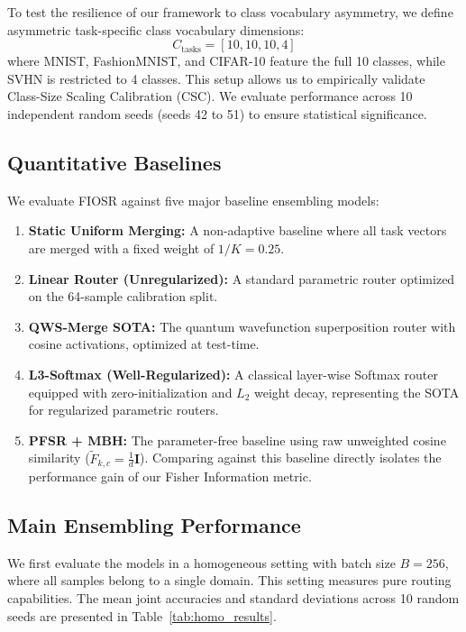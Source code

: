 To test the resilience of our framework to class vocabulary asymmetry, we define asymmetric task-specific class vocabulary dimensions:
\begin{equation}
C_{\text{tasks}} = [10, 10, 10, 4]
\end{equation}
where MNIST, FashionMNIST, and CIFAR-10 feature the full 10 classes, while SVHN is restricted to 4 classes. This setup allows us to empirically validate Class-Size Scaling Calibration (CSC). We evaluate performance across 10 independent random seeds (seeds 42 to 51) to ensure statistical significance.

\subsection{Quantitative Baselines}
\label{sec:baselines}
We evaluate FIOSR against five major baseline ensembling models:
\begin{enumerate}\setlength{\itemsep}{0.5pt}\setlength{\parskip}{0pt}
    \item \textbf{Static Uniform Merging:} A non-adaptive baseline where all task vectors are merged with a fixed weight of $1/K = 0.25$.
    \item \textbf{Linear Router (Unregularized):} A standard parametric router optimized on the 64-sample calibration split.
    \item \textbf{QWS-Merge SOTA:} The quantum wavefunction superposition router with cosine activations, optimized at test-time.
    \item \textbf{L3-Softmax (Well-Regularized):} A classical layer-wise Softmax router equipped with zero-initialization and $L_2$ weight decay, representing the SOTA for regularized parametric routers.
    \item \textbf{PFSR + MBH:} The parameter-free baseline using raw unweighted cosine similarity ($\tilde{F}_{k, c} = \frac{1}{d} \mathbf{I}$). Comparing against this baseline directly isolates the performance gain of our Fisher Information metric.
\end{enumerate}

\subsection{Main Ensembling Performance}
We first evaluate the models in a homogeneous setting with batch size $B=256$, where all samples belong to a single domain. This setting measures pure routing capabilities. The mean joint accuracies and standard deviations across 10 random seeds are presented in Table~\ref{tab:homo_results}.

